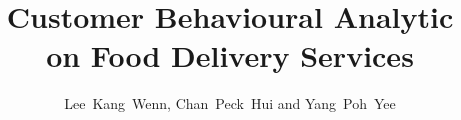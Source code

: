 \documentclass[journal]{IEEEtran}
\begin{document}
	\title{Customer Behavioural Analytic\\ on Food Delivery Services}
	
	\author{Lee~Kang~Wenn,
		Chan~Peck~Hui
		and Yang~Poh~Yee}%
	
	
	
	
\end{document}
